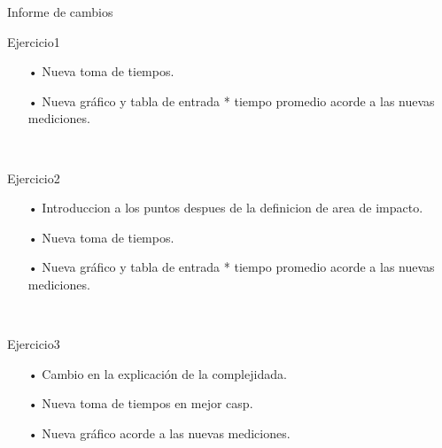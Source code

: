 \documentclass[10pt,a4paper]{article}
\begin{document}
\par{Informe de cambios}
\\
\par{Ejercicio1}
\begin{itemize}
\item[•] Nueva toma de tiempos.
\item[•] Nueva gráfico y tabla de entrada * tiempo promedio acorde a las nuevas mediciones.
\end{itemize}
\\
\par{Ejercicio2}
\begin{itemize}
\item[•] Introduccion a los puntos despues de la definicion de area de impacto.
\item[•] Nueva toma de tiempos.
\item[•] Nueva gráfico y tabla de entrada * tiempo promedio acorde a las nuevas mediciones.
\end{itemize}
\\
\par{Ejercicio3}
\begin{itemize}
\item[•] Cambio en la explicación de la complejidada.
\item[•] Nueva toma de tiempos en mejor casp.
\item[•] Nueva gráfico acorde a las nuevas mediciones.
\end{itemize}
\end{document}
